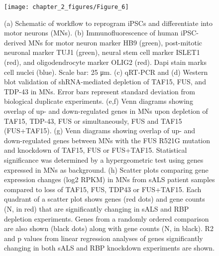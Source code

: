 \begin{figure}[ht]
  \centering
  \texttt{[image: chapter\_2\_figures/Figure\_6]}
  \caption[Figure 6. Comparison of motor neuron RNA signatures upon TAF15, FUS, or TDP-43 loss to two models of ALS]{(a) Schematic of workflow to reprogram iPSCs and differentiate into motor neurons (MNs). (b) Immunofluorescence of human iPSC-derived MNs for motor neuron marker HB9 (green), post-mitotic neuronal marker TUJ1 (green), neural stem cell marker ISLET1 (red), and oligodendrocyte marker OLIG2 (red). Dapi stain marks cell nuclei (blue). Scale bar: 25 μm. (c) qRT-PCR and (d) Western blot validation of shRNA-mediated depletion of TAF15, FUS, and TDP-43 in MNs. Error bars represent standard deviation from biological duplicate experiments. (e,f) Venn diagrams showing overlap of up- and down-regulated genes in MNs upon depletion of TAF15, TDP-43, FUS or simultaneously, FUS and TAF15 (FUS+TAF15). (g) Venn diagrams showing overlap of up- and down-regulated genes between MNs with the FUS R521G mutation and knockdown of TAF15, FUS or FUS+TAF15. Statistical significance was determined by a hypergeometric test using genes expressed in MNs as background. (h) Scatter plots comparing gene expression changes (log2 RPKM) in MNs from sALS patient samples compared to loss of TAF15, FUS, TDP43 or FUS+TAF15. Each quadrant of a scatter plot shows genes (red dots) and gene counts (N, in red) that are significantly changing in sALS and RBP depletion experiments. Genes from a randomly ordered comparison are also shown (black dots) along with gene counts (N, in black). R2 and p values from linear regression analyses of genes significantly changing in both sALS and RBP knockdown experiments are shown.}
  \label{fig:Figure_6}
\end{figure}


